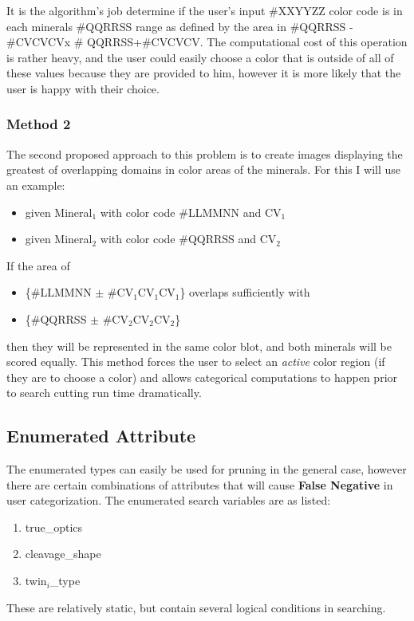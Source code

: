 \documentclass{article}
\def \EnumA{Enumerated Attribute\xspace}
\def \cv{CV}
\def \cs{cleavage\_shape\xspace}
\def \twt{twin$_i$\_type\xspace}
\def \to{true\_optics\xspace}
\def \FP{{\bf False Negative}\xspace}
\begin{document}
It is the algorithm's job determine if the user's input \#XXYYZZ color code is in each minerals \#QQRRSS range as defined by the area in \#QQRRSS - \#\cv{}\cv{}\cv x \# QQRRSS+\#\cv{}\cv{}\cv. The computational cost of this operation is rather heavy, and the user could easily choose a color that is outside of all of these values because they are provided to him, however it is more likely that the user is happy with their choice.

\subsubsection*{Method 2}
The second proposed approach to this problem is to create images displaying the greatest of overlapping domains in color areas of the minerals. For this I will use an example:

\def \ma{Mineral$_1$\xspace}
\def \cva{\cv$_1$\xspace}
\def \mb{Mineral$_2$\xspace}
\def \cvb{\cv$_2$\xspace}

\begin{itemize}
\item[] given \ma with color code \#LLMMNN and \cva
\item[] given \mb with color code \#QQRRSS and \cvb
\end{itemize}

If the area of 
\begin{itemize}
\item[] \{\#LLMMNN $\pm$ \#\cva{}\cva{}\cva{}\} overlaps sufficiently with 
\item[] \{\#QQRRSS $\pm$ \#\cvb{}\cvb{}\cvb{}\} 
\end{itemize}
then they will be represented in the same color blot, and both minerals will be scored equally. This method forces the user to select an \emph{active} color region (if they are to choose a color) and allows categorical computations to happen prior to search cutting run time dramatically. 

\subsection*{\EnumA}
The enumerated types can easily be used for pruning in the general case, however there are certain combinations of attributes that will cause \FP in user categorization. The enumerated search variables are as listed:
\begin{enumerate}
\item \to
\item \cs
\item \twt
\end{enumerate}
These are relatively static, but contain several logical conditions in searching. 
\end{document}

